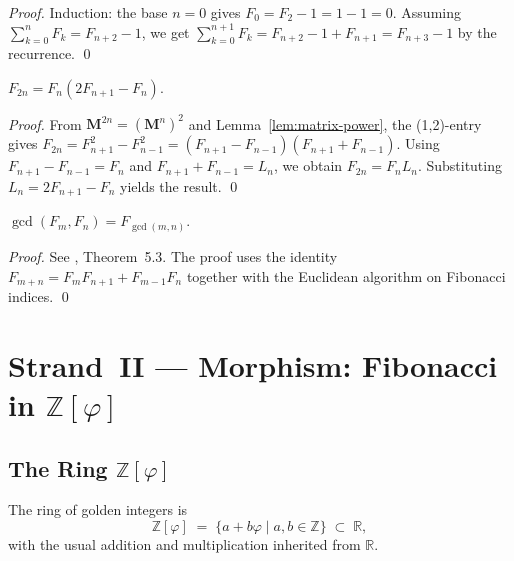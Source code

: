 \begin{proof}
Induction: the base \(n=0\) gives \(F_0 = F_2 - 1 = 1 - 1 = 0\). \checkmark
Assuming \(\sum_{k=0}^n F_k = F_{n+2}-1\), we get
\(\sum_{k=0}^{n+1} F_k = F_{n+2}-1+F_{n+1} = F_{n+3}-1\)
by the recurrence.
\qed
\end{proof}

\begin{proposition}\label{prop:even-index}
\(
  F_{2n} = F_n(2F_{n+1} - F_n).
\)
\end{proposition}

\begin{proof}
From \(\mathbf{M}^{2n} = (\mathbf{M}^n)^2\) and
Lemma~\ref{lem:matrix-power}, the (1,2)-entry gives
\(F_{2n} = F_{n+1}^2 - F_{n-1}^2 = (F_{n+1}-F_{n-1})(F_{n+1}+F_{n-1})\).
Using \(F_{n+1} - F_{n-1} = F_n\) and
\(F_{n+1} + F_{n-1} = L_n\), we obtain \(F_{2n} = F_n L_n\).
Substituting \(L_n = 2F_{n+1} - F_n\) yields the result.
\qed
\end{proof}

\begin{proposition}\label{prop:gcd}
\(
  \gcd(F_m, F_n) = F_{\gcd(m,n)}.
\)
\end{proposition}

\begin{proof}
See \cite{koshy_fib_lucas}, Theorem~5.3.  The proof uses the identity
\(F_{m+n} = F_m F_{n+1} + F_{m-1} F_n\) together with the Euclidean
algorithm on Fibonacci indices.
\qed
\end{proof}

\section{Strand~II — Morphism: Fibonacci in \(\mathbb{Z}[\varphi]\)}
\label{sec:ch7-strand2}

\subsection{The Ring \(\mathbb{Z}[\varphi]\)}\label{subsec:ch7-ring}

\begin{definition}\label{def:golden-integers}
The ring of golden integers is
\[
  \mathbb{Z}[\varphi] \;=\; \{a + b\varphi \mid a, b \in \mathbb{Z}\}
\;\subset\; \mathbb{R},
\]
with the usual addition and multiplication inherited from \(\mathbb{R}\).
\end{definition}

